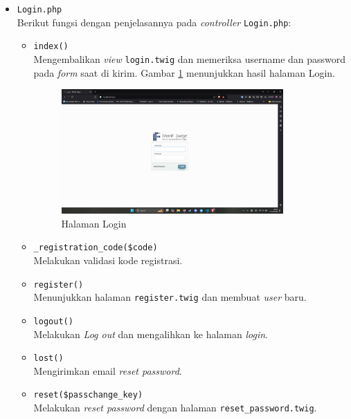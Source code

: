 \documentclass[a4paper,twoside]{article}
\begin{document}
\begin{enumerate}
\begin{itemize}
\begin{itemize}
			            \item \verb|Login.php| \\
			                  Berikut fungsi dengan penjelasannya pada \textit{controller} \verb|Login.php|:

			                  \begin{itemize}
				                  \item \verb|index()| \\
				                        Mengembalikan \textit{view} \verb|login.twig| dan memeriksa username dan password pada \textit{form} saat di kirim. Gambar \ref{fig:3:1:1:login} menunjukkan hasil halaman Login.

				                        \begin{figure}[H]
					                        \centering
					                        \includegraphics[width=0.85\textwidth]{views/login.png}
					                        \caption{Halaman Login}
					                        \label{fig:3:1:1:login}
				                        \end{figure}
				                  \item \verb|_registration_code($code)| \\
				                        Melakukan validasi kode registrasi.
				                  \item \verb|register()| \\
				                        Menunjukkan halaman \verb|register.twig| dan membuat \textit{user} baru.
				                  \item \verb|logout()| \\
				                        Melakukan \textit{Log out} dan mengalihkan ke halaman \textit{login}.
				                  \item \verb|lost()| \\
				                        Mengirimkan email \textit{reset password}.
				                  \item \verb|reset($passchange_key)| \\
				                        Melakukan \textit{reset password} dengan halaman \verb|reset_password.twig|.


\end{itemize}
\end{itemize}
\end{itemize}
\end{enumerate}
\end{document}
